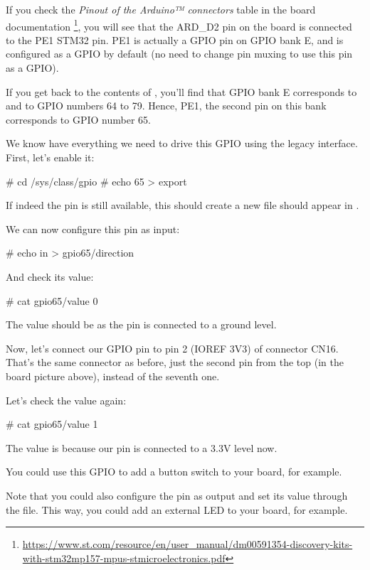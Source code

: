 If you check the {\em Pinout of the Arduino™ connectors} table in the board
documentation
\footnote{\url{https://www.st.com/resource/en/user_manual/dm00591354-discovery-kits-with-stm32mp157-mpus-stmicroelectronics.pdf}},
you will see that the ARD\_D2 pin on the board is connected to the PE1
STM32 pin. PE1 is actually a GPIO pin on GPIO bank E, and is configured
as a GPIO by default (no need to change pin muxing to use this pin as
a GPIO).

If you get back to the contents of , you'll
find that GPIO bank E corresponds to  and to GPIO
numbers 64 to 79. Hence, PE1, the second pin on this bank corresponds to
GPIO number 65.

We know have everything we need to drive this GPIO using the legacy
interface. First, let's enable it:

\begin{bashinput}
# cd /sys/class/gpio
# echo 65 > export
\end{bashinput}

If indeed the pin is still available, this should create a new
 file should appear in .

We can now configure this pin as input:

\begin{bashinput}
# echo in > gpio65/direction
\end{bashinput}

And check its value:

\begin{bashinput}
# cat gpio65/value
0
\end{bashinput}

The value should be  as the pin is connected to a ground level.

Now, let's connect our GPIO pin to pin 2 (IOREF 3V3) of connector CN16.
That's the same connector as before, just the second pin from the top
(in the board picture above), instead of the seventh one.

Let's check the value again:

\begin{bashinput}
# cat gpio65/value
1
\end{bashinput}

The value is  because our pin is connected to a 3.3V level now.

You could use this GPIO to add a button switch to your board, for
example.

Note that you could also configure the pin as output and set its value
through the  file. This way, you could add an external LED
to your board, for example.

